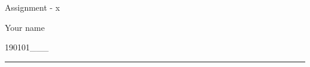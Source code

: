 \documentclass{article}
\begin{document}
\centerline{Assignment - x}
\centerline{Your name}
\centerline{190101___}
\hrule
\begin{enumerate}   
    
\end{enumerate} 
\end{document}
